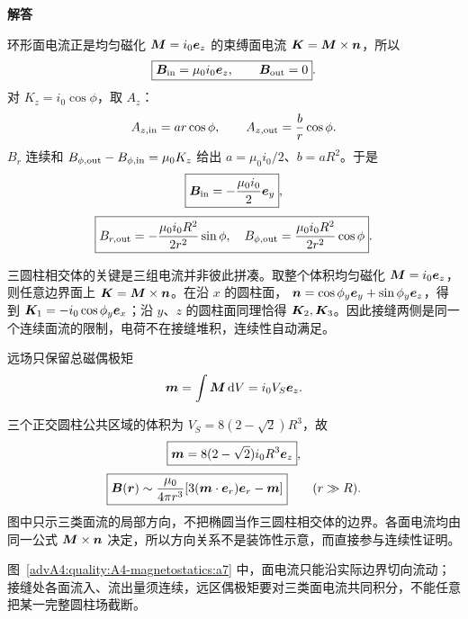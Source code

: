\begin{advsolution}
\begin{center}\begin{minipage}{.96\linewidth}\centering
\raggedright{\bfseries\color{DeepBlue}解答}\par\smallskip\centering

\label{advA4:quality:A4-magnetostatics:a7}
\end{minipage}\end{center}

环形面电流正是均匀磁化 $\bm{M}=i_0\bm{e}_z$ 的束缚面电流
$\bm{K}=\bm{M}\times\bm{n}$，所以
\[
 \boxed{\bm{B}_{\rm in}=\mu_0i_0\bm{e}_z,\qquad
 \bm{B}_{\rm out}=0}.
\]
对 $K_z=i_0\cos\phi$，取 $A_z$：
\[
 A_{z,\rm in}=ar\cos\phi,\qquad
 A_{z,\rm out}=\frac b r\cos\phi.
\]
$B_r$ 连续和
$B_{\phi,\rm out}-B_{\phi,\rm in}=\mu_0K_z$ 给出
$a=\mu_0i_0/2$、$b=aR^2$。于是
\[
 \boxed{\bm{B}_{\rm in}=-\frac{\mu_0i_0}{2}\bm{e}_y},
\]
\[
 \boxed{B_{r,\rm out}=-\frac{\mu_0i_0R^2}{2r^2}\sin\phi,\quad
 B_{\phi,\rm out}=\frac{\mu_0i_0R^2}{2r^2}\cos\phi}.
\]

三圆柱相交体的关键是三组电流并非彼此拼凑。取整个体积均匀磁化
$\bm{M}=i_0\bm{e}_z$，则任意边界面上
$\bm{K}=\bm{M}\times\bm{n}$。在沿 $x$ 的圆柱面，
$\bm{n}=\cos\phi_y\bm{e}_y+\sin\phi_y\bm{e}_z$，得到
$\bm{K}_1=-i_0\cos\phi_y\bm{e}_x$；沿 $y$、$z$ 的圆柱面同理恰得 $\bm{K}_2,\bm{K}_3$。因此接缝两侧是同一个连续面流的限制，电荷不在接缝堆积，连续性自动满足。

远场只保留总磁偶极矩
\[
 \bm{m}=\int\bm{M}\mathop{}\!\mathrm d V=i_0V_S\bm{e}_z.
\]


三个正交圆柱公共区域的体积为
$V_S=8(2-\sqrt2)R^3$，故
\[
 \boxed{\bm{m}=8(2-\sqrt2)i_0R^3\bm{e}_z},
\]
\[
 \boxed{\bm{B}(\bm{r})\sim\frac{\mu_0}{4\pi r^3}
 [3(\bm{m}\cdot\bm{e}_r)\bm{e}_r-\bm{m}]}
 \qquad(r\gg R).
\]
图中只示三类面流的局部方向，不把椭圆当作三圆柱相交体的边界。各面电流均由同一公式
$\bm{M}\times\bm{n}$ 决定，所以方向关系不是装饰性示意，而直接参与连续性证明。

图~\ref{advA4:quality:A4-magnetostatics:a7} 中，面电流只能沿实际边界切向流动；接缝处各面流入、流出量须连续，远区偶极矩要对三类面电流共同积分，不能任意把某一完整圆柱场截断。
\end{advsolution}
